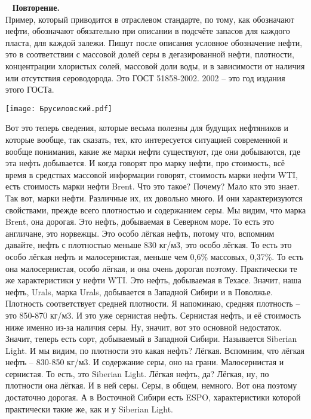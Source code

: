 \documentclass[main.tex]{subfiles}
\begin{document}
\ \newline
\textbf{Повторение.}\\
Пример, который приводится в отраслевом стандарте, по тому, как обозначают нефти,
обозначают обязательно при описании в подсчёте запасов для каждого пласта, для каждой залежи.
Пишут после описания условное обозначение нефти, это в соответствии с массовой долей серы в дегазированной нефти, плотности, концентрации хлористых солей, массовой доли воды, и в зависимости от наличия или отсутствия сероводорода.
Это ГОСТ 51858-2002.
2002 -- это год издания этого ГОСТа.

\begin{center}
\texttt{[image: Брусиловский.pdf]}
\end{center}

Вот это теперь сведения, которые весьма полезны для будущих нефтяников и которые вообще, так сказать, тех, кто интересуется ситуацией современной
и вообще понимания, какие же марки нефти существуют, где они добываются, где эта нефть добывается.
И когда говорят про марку нефти, про стоимость, всё время в средствах массовой информации говорят, стоимость марки нефти WTI, есть стоимость марки нефти Brent.
Что это такое? Почему?
Мало кто это знает.
Так вот, марки нефти.
Различные их, их довольно много.
И они характеризуются свойствами, прежде всего плотностью и содержанием серы.
Мы видим, что марка Brent, она дорогая.
Это нефть, добываемая в Северном море.
То есть это англичане, это норвежцы.
Это особо лёгкая нефть, потому что, вспомним давайте, нефть с плотностью меньше 830 кг/м3, это особо лёгкая.
То есть это особо лёгкая нефть и малосернистая, меньше чем 0,6\% массовых, 0,37\%.
То есть она малосернистая, особо лёгкая, и она очень дорогая поэтому.
Практически те же характеристики у нефти WTI.
Это нефть, добываемая в Техасе.
Значит, наша нефть, Urals, марка Urals, добывается в Западной Сибири и в Поволжье.
Плотность соответствует средней плотности.
Я напоминаю, средняя плотность -- это 850-870 кг/м3.
И это уже сернистая нефть.
Сернистая нефть, и её стоимость ниже именно из-за наличия серы.
Ну, значит, вот это основной недостаток.
Значит, теперь есть сорт, добываемый в Западной Сибири.
Называется Siberian Light.
И мы видим, по плотности это какая нефть?
Лёгкая.
Вспомним, что лёгкая нефть -- 830-850 кг/м3.
И содержание серы, оно на грани.
Малосернистая и сернистая.
То есть, это Siberian Light.
Лёгкая нефть, да?
Лёгкая, ну, по плотности она лёгкая.
И в ней серы.
Серы, в общем, немного.
Вот она поэтому достаточно дорогая.
А в Восточной Сибири есть ESPO, характеристики которой практически такие же, как и у Siberian Light.
\end{document}

